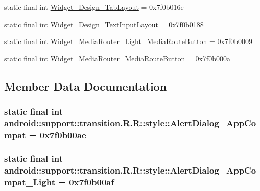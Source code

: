 \begin{CompactItemize}
static final int \hyperlink{classandroid_1_1support_1_1transition_1_1_r_1_1style_8983ddcd26c2e01e71720ddff3f647e1}{Widget\_\-Design\_\-TabLayout} = 0x7f0b016e
\item 
static final int \hyperlink{classandroid_1_1support_1_1transition_1_1_r_1_1style_ee06babd2e8432fdd00c1361579e902c}{Widget\_\-Design\_\-TextInputLayout} = 0x7f0b0188
\item 
static final int \hyperlink{classandroid_1_1support_1_1transition_1_1_r_1_1style_afc54ef1d5558233d88424875d0263a2}{Widget\_\-MediaRouter\_\-Light\_\-MediaRouteButton} = 0x7f0b0009
\item 
static final int \hyperlink{classandroid_1_1support_1_1transition_1_1_r_1_1style_eeeb72fefb1a7623f50cb8610cfd9c2f}{Widget\_\-MediaRouter\_\-MediaRouteButton} = 0x7f0b000a
\end{CompactItemize}


\subsection{Member Data Documentation}
\hypertarget{classandroid_1_1support_1_1transition_1_1_r_1_1style_340cb4eb4467b2140f9666f91764533e}{
\subsubsection[{AlertDialog\_\-AppCompat}]{\setlength{\rightskip}{0pt plus 5cm}static final int android::support::transition.R.R::style::AlertDialog\_\-AppCompat = 0x7f0b00ae}}
\label{classandroid_1_1support_1_1transition_1_1_r_1_1style_340cb4eb4467b2140f9666f91764533e}


\hypertarget{classandroid_1_1support_1_1transition_1_1_r_1_1style_2df4ef07844a3d8840e688c1e21f2174}{
\subsubsection[{AlertDialog\_\-AppCompat\_\-Light}]{\setlength{\rightskip}{0pt plus 5cm}static final int android::support::transition.R.R::style::AlertDialog\_\-AppCompat\_\-Light = 0x7f0b00af}}
\label{classandroid_1_1support_1_1transition_1_1_r_1_1style_2df4ef07844a3d8840e688c1e21f2174}


